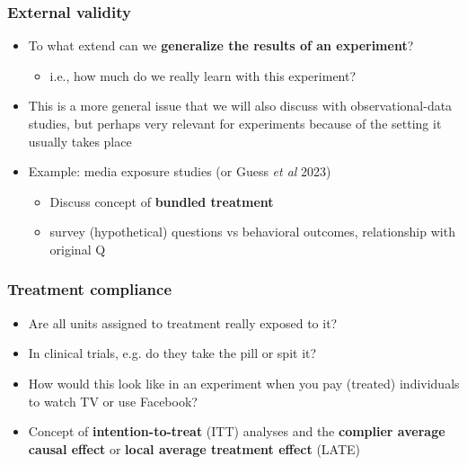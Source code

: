 \begin{frame}
\frametitle{External validity}
\centering

\begin{itemize}
  \item To what extend can we \textbf{generalize the results of an experiment}?
  \begin{itemize}
    \item i.e., how much do we really learn with this experiment?
  \end{itemize}
  \item This is a more general issue that we will also discuss with observational-data studies, but perhaps very relevant for experiments because of the setting it usually takes place
  \item Example: media exposure studies (or Guess \textit{et al} 2023)
  \begin{itemize}
    \item {} Discuss concept of \textbf{bundled treatment}
    \item {} survey (hypothetical) questions vs behavioral outcomes, relationship with original Q
  \end{itemize}
\end{itemize}

\end{frame}
\note{}

\begin{frame}
\frametitle{Treatment compliance}
\centering

\begin{itemize}
  \item Are all units assigned to treatment really exposed to it?
  \item In clinical trials, e.g. do they take the pill or spit it?
  \item How would this look like in an experiment when you pay (treated) individuals to watch TV or use Facebook?
  \item Concept of \textbf{intention-to-treat} (ITT) analyses and the \textbf{complier average causal effect} or \textbf{local average treatment effect} (LATE)
\end{itemize}

\end{frame}
\note{}

